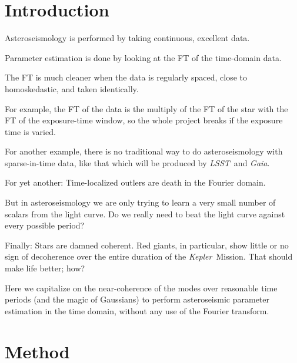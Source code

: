 \documentclass[modern]{aastex61}
\newcommand{\acronym}[1]{{\small{#1}}}
\newcommand{\project}[1]{\textsl{#1}}
\newcommand{\kepler}{\project{Kepler}}
\newcommand{\gaia}{\project{Gaia}}
\newcommand{\lsst}{\project{\acronym{LSST}}}
\begin{document}

\section{Introduction}\label{sec:intro}

Asteroseismology is performed by taking continuous, excellent data.

Parameter estimation is done by looking at the FT of the time-domain data.

The FT is much cleaner when the data is regularly spaced, close to
homoskedastic, and taken identically.

For example, the FT of the data is the multiply of the FT of the star
with the FT of the exposure-time window, so the whole project breaks
if the exposure time is varied.

For another example, there is no traditional way to do
asteroseismology with sparse-in-time data, like that which will be
produced by \lsst\ and \gaia.

For yet another: Time-localized outlers are death in the Fourier domain.

But in asteroseismology we are only trying to learn a very small number
of scalars from the light curve. Do we really need to beat the light curve
against every possible period?

Finally: Stars are damned coherent. Red giants, in particular, show little
or no sign of decoherence over the entire duration of the \kepler\ Mission.
That should make life better; how?

Here we capitalize on the near-coherence of the modes over reasonable
time periods (and the magic of Gaussians) to perform asteroseismic
parameter estimation in the time domain, without any use of the
Fourier transform.

\section{Method}\label{sec:method}
\end{document}
